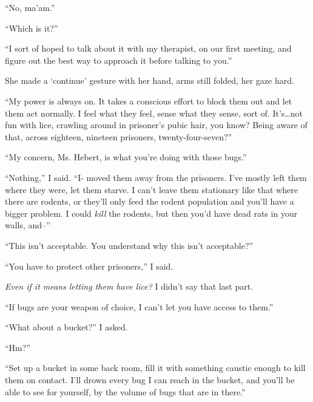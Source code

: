 ``No, ma'am.''



``Which is it?''



``I sort of hoped to talk about it with my therapist, on our first meeting, and figure out the best way to approach it before talking to you.''



She made a `continue' gesture with her hand, arms still folded, her gaze hard.



``My power is always on.  It takes a conscious effort to block them out and let them act normally.  I feel what they feel, sense what they sense, sort of.  It's\ldots not fun with lice, crawling around in prisoner's pubic hair, you know?  Being aware of that, across eighteen, nineteen prisoners, twenty-four-seven?''



``My concern, Ms. Hebert, is what you're doing with those bugs.''



``Nothing,'' I said.  ``I- moved them away from the prisoners.  I've mostly left them where they were, let them starve.  I can't leave them stationary like that where there are rodents, or they'll only feed the rodent population and you'll have a bigger problem.  I could \emph{kill} the rodents, but then you'd have dead rats in your walls, and--''



``This isn't acceptable.  You understand why this isn't acceptable?''



``You have to protect other prisoners,'' I said.



\emph{Even if it means letting them have lice?  }I didn't say that last part.



``If bugs are your weapon of choice, I can't let you have access to them.''



``What about a bucket?'' I asked.



``Hm?''



``Set up a bucket in some back room, fill it with something caustic enough to kill them on contact.  I'll drown every bug I can reach in the bucket, and you'll be able to see for yourself, by the volume of bugs that are in there.''



